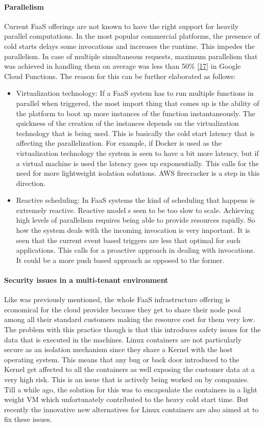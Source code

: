 \documentclass[12pt,titlepage]{article}
\begin{document}
\paragraph{Parallelism}
\label{sec:org210d059}
Current FaaS offerings are not known to have the right support for heavily
parallel computations. In the most popular commercial platforms, the presence of
cold starts delays some invocations and increases the runtime. This impedes the
parallelism. In case of multiple
simultaneous requests, maximum parallelism that was achieved in handling them on
average was less than 50\% \hyperref[ref:17]{[17}] in Google Cloud Functions. The reason for
this can be further elaborated as follows:
\begin{itemize}
\item Virtualization technology: If a FaaS system has to run multiple functions in
parallel when triggered, the most import thing that comes up is the ability of
the platform to boot up more instances of the function instantaneously. The
quickness of the creation of the instances depends on the virtualization
technology that is being used. This is basically the cold start latency that
is affecting the parallelization. For example, if Docker is used as the
virtualization technology the system is seen to have a bit more latency, but
if a virtual machine is used the latency goes up exponentially. This calls for
the need for more lightweight isolation solutions. AWS firecracker is a step
in this direction.
\item Reactive scheduling: In FaaS systems the kind of scheduling that happens is
extremely reactive. Reactive model s seen to be too slow to scale. Achieving
high levels of parallelism requires being able to provide resources rapidly.
So how the system deals with the incoming invocation is very important. It is
seen that the current event based triggers are less that optimal for such
applications. This calls for a proactive approach in dealing with invocations.
It could be a more push based approach as opposed to the former.
\end{itemize}
\paragraph{Security issues in a multi-tenant environment}
\label{sec:orgbc0a4d5}
Like was previously mentioned, the whole FaaS infrastructure offering is
economical for the cloud provider because they get to share their node pool
among all their standard customers making the resource cost for them very low.
The problem with this practice though is that this introduces safety issues for
the data that is executed in the machines. Linux containers are not
particularly secure as an isolation mechanism since they share a Kernel with the
host operating system. This means that any bug or back door introduced to the
Kernel get affected to all the containers as well exposing the customer data at
a very high risk. This is an issue that is actively being worked on by
companies. Till a while ago, the solution for this was to encapsulate the
containers in a light weight VM which unfortunately contributed to the heavy
cold start time. But recently the innovative new alternatives for Linux
containers are also aimed at to fix these issues.
\end{document}
